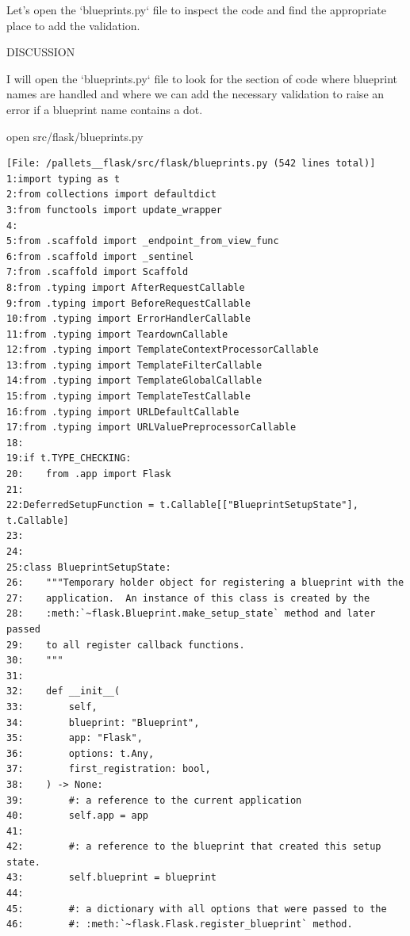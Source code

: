 {\begin{agentbox}
Let's open the `blueprints.py` file to inspect the code and find the appropriate place to add the validation.



DISCUSSION

I will open the `blueprints.py` file to look for the section of code where blueprint names are handled and where we can add the necessary validation to raise an error if a blueprint name contains a dot.



\hrulefill
\begin{CodeVerbatim}[breaklines=true, breakanywhere=true]
open src/flask/blueprints.py
\end{CodeVerbatim}
\end{agentbox}
\begin{observationbox}\begin{Verbatim}[breaklines=true, breakanywhere=true]
[File: /pallets__flask/src/flask/blueprints.py (542 lines total)]
1:import typing as t
2:from collections import defaultdict
3:from functools import update_wrapper
4:
5:from .scaffold import _endpoint_from_view_func
6:from .scaffold import _sentinel
7:from .scaffold import Scaffold
8:from .typing import AfterRequestCallable
9:from .typing import BeforeRequestCallable
10:from .typing import ErrorHandlerCallable
11:from .typing import TeardownCallable
12:from .typing import TemplateContextProcessorCallable
13:from .typing import TemplateFilterCallable
14:from .typing import TemplateGlobalCallable
15:from .typing import TemplateTestCallable
16:from .typing import URLDefaultCallable
17:from .typing import URLValuePreprocessorCallable
18:
19:if t.TYPE_CHECKING:
20:    from .app import Flask
21:
22:DeferredSetupFunction = t.Callable[["BlueprintSetupState"], t.Callable]
23:
24:
25:class BlueprintSetupState:
26:    """Temporary holder object for registering a blueprint with the
27:    application.  An instance of this class is created by the
28:    :meth:`~flask.Blueprint.make_setup_state` method and later passed
29:    to all register callback functions.
30:    """
31:
32:    def __init__(
33:        self,
34:        blueprint: "Blueprint",
35:        app: "Flask",
36:        options: t.Any,
37:        first_registration: bool,
38:    ) -> None:
39:        #: a reference to the current application
40:        self.app = app
41:
42:        #: a reference to the blueprint that created this setup state.
43:        self.blueprint = blueprint
44:
45:        #: a dictionary with all options that were passed to the
46:        #: :meth:`~flask.Flask.register_blueprint` method.

\end{Verbatim}
\end{observationbox}}
